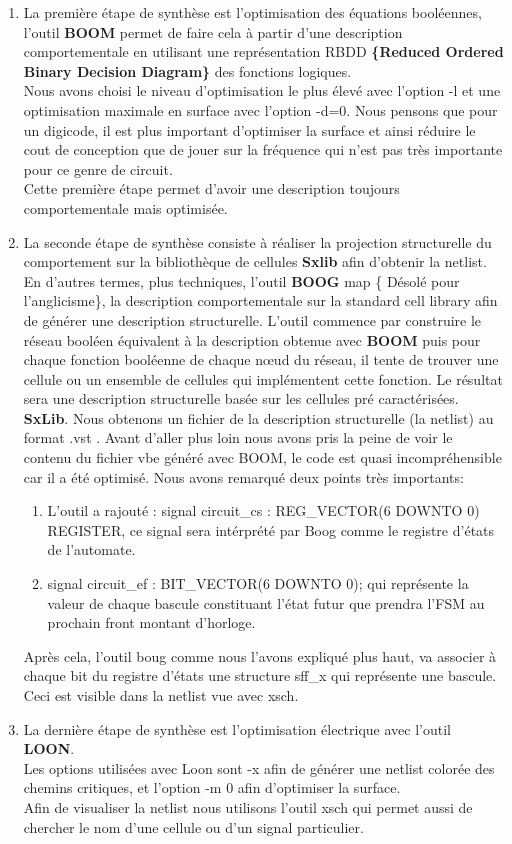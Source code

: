 \documentclass[12pt]{article}
\begin{document}
\begin{enumerate}
\item La première étape de synthèse est l'optimisation des équations booléennes, l'outil \textbf{BOOM} permet de faire cela à partir d'une description comportementale en utilisant une représentation RBDD \textbf{\{Reduced Ordered Binary Decision Diagram\}} des fonctions logiques.\\
Nous avons choisi le niveau d'optimisation le plus élevé avec l'option -l et une optimisation maximale en surface avec l'option -d=0. Nous pensons que pour un digicode, il est plus important d'optimiser la surface et ainsi réduire le cout de conception que de jouer sur la fréquence qui n'est pas très importante pour ce genre de circuit.\\
Cette première étape permet d'avoir une description toujours comportementale mais optimisée.
\item La seconde étape de synthèse consiste à réaliser la projection structurelle du comportement sur la bibliothèque de cellules \textbf{Sxlib} afin d'obtenir la netlist. En d'autres termes, plus techniques, l'outil \textbf{BOOG} map \{ Désolé pour l'anglicisme\}, la description comportementale sur la standard cell library afin de générer une description structurelle. L'outil commence par construire le réseau booléen équivalent à la description obtenue avec \textbf{BOOM} puis pour chaque fonction booléenne  de chaque nœud du réseau, il tente de trouver une cellule ou un ensemble de cellules  qui implémentent cette fonction. Le résultat sera une description structurelle basée sur les cellules pré caractérisées. \textbf{SxLib}. Nous obtenons un fichier de la description structurelle (la netlist) au format .vst .
Avant d'aller plus loin nous avons pris la peine de voir le contenu du fichier vbe généré avec BOOM, le code est quasi incompréhensible car il a été optimisé. Nous avons remarqué deux points très importants:
\begin{enumerate}
\item L'outil a rajouté : \color{red}signal \color{black}circuit\_cs : \color{red}REG\_VECTOR\color{green}(6 DOWNTO 0) \color{black}REGISTER, ce signal sera intérprété par Boog comme le registre d'états de l'automate.
\item \color{red}signal \color{black}circuit\_ef : \color{red}BIT\_VECTOR\color{green}(6 DOWNTO 0)\color{black}; qui représente la valeur de chaque bascule constituant l'état futur que prendra l'FSM au prochain front montant d'horloge.
\end{enumerate}
Après cela, l'outil boug comme nous l'avons expliqué plus haut, va associer à chaque bit du registre d'états une structure sff\_x qui représente une bascule. Ceci est visible dans la netlist vue avec xsch.
\item La dernière étape de synthèse est l'optimisation électrique avec l'outil \textbf{LOON}.\\
Les options utilisées avec Loon sont -x afin de générer une netlist colorée des chemins critiques, et l'option -m 0 afin d'optimiser la surface.\\
Afin de visualiser la netlist nous utilisons l'outil xsch qui permet aussi de chercher le nom d'une cellule ou d'un signal particulier.


\end{enumerate}
\end{document}
